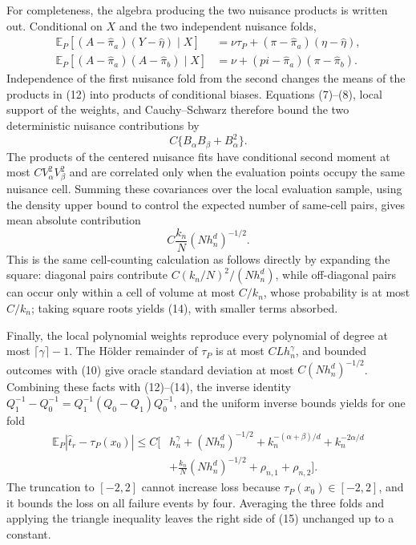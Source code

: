 For completeness, the algebra producing the two nuisance products is written
out.  Conditional on \(X\) and the two independent nuisance folds,
\[
\begin{aligned}
\mathbb E_P[(A-\widehat\pi_a)(Y-\widehat\eta)\mid X]
&=\nu\tau_P+(\pi-\widehat\pi_a)(\eta-\widehat\eta),\\
\mathbb E_P[(A-\widehat\pi_a)(A-\widehat\pi_b)\mid X]
&=\nu+(pi-\widehat\pi_a)(\pi-\widehat\pi_b).
\end{aligned} \tag{12}
\]
Independence of the first nuisance fold from the second changes the means of
the products in (12) into products of conditional biases.  Equations
(7)--(8), local support of the weights, and Cauchy--Schwarz therefore bound
the two deterministic nuisance contributions by
\[
C\{B_\alpha B_\beta+B_\alpha^2\}. \tag{13}
\]
The products of the centered nuisance fits have conditional second moment at
most \(C V_\alpha^2V_\beta^2\) and are correlated only when the evaluation
points occupy the same nuisance cell.  Summing these covariances over the
local evaluation sample, using the density upper bound to control the expected
number of same-cell pairs, gives mean absolute contribution
\[
C\frac{k_n}{N}(Nh_n^d)^{-1/2}. \tag{14}
\]
This is the same cell-counting calculation as follows directly by expanding
the square: diagonal pairs contribute
\(C(k_n/N)^2/(Nh_n^d)\), while off-diagonal pairs can occur only within a
cell of volume at most \(C/k_n\), whose probability is at most \(C/k_n\);
taking square roots yields (14), with smaller terms absorbed.

Finally, the local polynomial weights reproduce every polynomial of degree at
most \(\lceil\gamma\rceil-1\).  The H\"older remainder of \(\tau_P\) is
at most \(CLh_n^\gamma\), and bounded outcomes with (10) give oracle
standard deviation at most \(C(Nh_n^d)^{-1/2}\).  Combining these facts with
(12)--(14), the inverse identity
\(Q_1^{-1}-Q_0^{-1}=Q_1^{-1}(Q_0-Q_1)Q_0^{-1}\), and the uniform inverse
bounds yields for one fold
\[
\begin{aligned}
\mathbb E_P|\widehat t_r-\tau_P(x_0)|
\leq C\bigg[&h_n^\gamma+(Nh_n^d)^{-1/2}
+k_n^{-(\alpha+\beta)/d}+k_n^{-2\alpha/d}\\
&+\frac{k_n}{N}(Nh_n^d)^{-1/2}
+\rho_{n,1}+\rho_{n,2}\bigg]. \tag{15}
\end{aligned}
\]
The truncation to \([-2,2]\) cannot increase loss because
\(\tau_P(x_0)\in[-2,2]\), and it bounds the loss on all failure events by
four.  Averaging the three folds and applying the triangle inequality leaves
the right side of (15) unchanged up to a constant.

